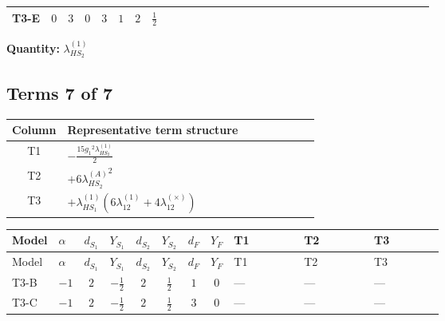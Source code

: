 \documentclass[8pt]{article}
\begin{document}
\begin{landscape}
\begin{longtable}{@{}llcccccc >{\raggedright\arraybackslash}p{0.21\linewidth} >{\raggedright\arraybackslash}p{0.21\linewidth} >{\raggedright\arraybackslash}p{0.21\linewidth}@{}}
\midrule
T3-E & $0$ & $3$ & $0$ & $3$ & $1$ & $2$ & $\frac{1}{2}$ & \scriptsize\adjustbox{max width=\linewidth}{$\begin{gathered} +6 {g_2}^4\end{gathered}$} & \scriptsize\adjustbox{max width=\linewidth}{$\begin{gathered} -\frac{33 {g_2}^2 {\lambda_{HS_2}^{(1)}}}{2}\end{gathered}$} & \scriptsize\adjustbox{max width=\linewidth}{$\begin{gathered} +3 {g_1}^4\end{gathered}$} \\
\midrule
\bottomrule
\end{longtable}
\clearpage
\noindent\textbf{Quantity: }$\lambda_{HS_2}^{(1)}$\par\smallskip
\subsection*{Terms 7 of 7}
\begin{center}
\begin{tabular}{@{}c >{\raggedright\arraybackslash}p{0.82\linewidth}@{}}
\toprule
Column & Representative term structure \\
\midrule
T1 & \(\displaystyle -\frac{15 {g_1}^2 {\lambda_{HS_2}^{(1)}}}{2}\) \\
\midrule
T2 & \(\displaystyle +6 {\lambda_{HS_2}^{(A)}}^2\) \\
\midrule
T3 & \(\displaystyle +{\lambda_{HS_1}^{(1)}} (6 {\lambda_{12}^{(1)}}+4 {\lambda_{12}^{(\times)}})\) \\
\midrule
\bottomrule
\end{tabular}
\end{center}
\smallskip
\tiny
\begin{longtable}{@{}llcccccc >{\raggedright\arraybackslash}p{0.21\linewidth} >{\raggedright\arraybackslash}p{0.21\linewidth} >{\raggedright\arraybackslash}p{0.21\linewidth}@{}}
\toprule
Model & $\alpha$ & $d_{S_1}$ & $Y_{S_1}$ & $d_{S_2}$ & $Y_{S_2}$ & $d_F$ & $Y_F$ & T1 & T2 & T3 \\
\midrule
\endfirsthead
\toprule
Model & $\alpha$ & $d_{S_1}$ & $Y_{S_1}$ & $d_{S_2}$ & $Y_{S_2}$ & $d_F$ & $Y_F$ & T1 & T2 & T3 \\
\midrule
\endhead
T3-B & $-1$ & $2$ & $-\frac{1}{2}$ & $2$ & $\frac{1}{2}$ & $1$ & $0$ & --- & --- & --- \\
\midrule
T3-C & $-1$ & $2$ & $-\frac{1}{2}$ & $2$ & $\frac{1}{2}$ & $3$ & $0$ & --- & --- & --- \\

\end{longtable}
\end{landscape}
\end{document}

